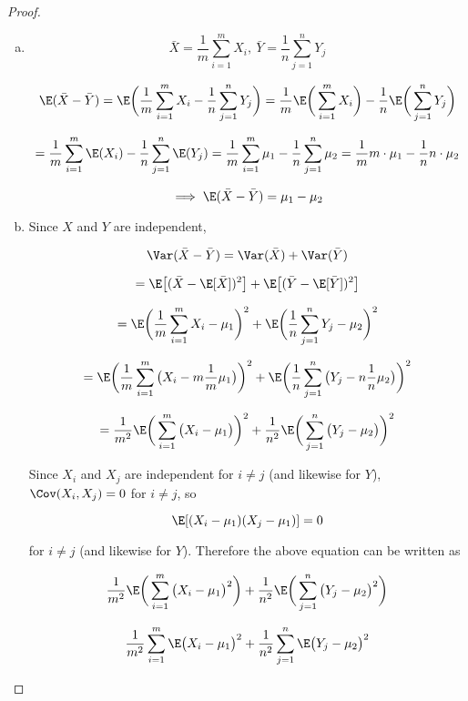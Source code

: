 \begin{proof}

\begin{enumerate}[a.]

\item

\[
\bar{X} = \frac{1}{m} \sum_{i=1}^m X_i, \ \bar{Y} = \frac{1}{n} \sum_{j=1}^n Y_j 
\]


\[
\E(\bar{X} - \bar{Y}) = \E\bigg(\frac{1}{m} \sum_{i=1}^m X_i - \frac{1}{n} \sum_{j=1}^n Y_j \bigg) = \frac{1}{m} \E\bigg( \sum_{i=1}^m X_i\bigg) - \frac{1}{n} \E \bigg(\sum_{j=1}^n Y_j \bigg)
\]

\[
= \frac{1}{m}  \sum_{i=1}^m \E (X_i)  - \frac{1}{n} \sum_{j=1}^n \E(Y_j) = \frac{1}{m}  \sum_{i=1}^m \mu_1  - \frac{1}{n} \sum_{j=1}^n \mu_2 = \frac{1}{m} m \cdot \mu_1 - \frac{1}{n} n \cdot \mu_2
\]

\[
\implies
\E(\bar{X} - \bar{Y}) = \mu_1 - \mu_2
\]

\item 

Since \(X\) and \(Y\) are independent,

\[
\Var (\bar{X} - \bar{Y}) = \Var(\bar{X}) + \Var(\bar{Y})
\]

\[
= \E\big[ (\bar{X} - \E[\bar{X}])^2 \big] + \E\big[ (\bar{Y} - \E[\bar{Y}])^2 \big]
\]

\[
= \E\bigg( \frac{1}{m} \sum_{i=1}^m X_i - \mu_1 \bigg)^2 + \E\bigg( \frac{1}{n} \sum_{j=1}^n Y_j - \mu_2 \bigg)^2
\]

\[
= \E\bigg( \frac{1}{m} \sum_{i=1}^m \big(X_i - m \frac{1}{m} \mu_1\big) \bigg)^2 + \E\bigg( \frac{1}{n} \sum_{j=1}^n \big( Y_j - n \frac{1}{n} \mu_2 \big) \bigg)^2
\]

\[
= \frac{1}{m^2 }\E\bigg(\sum_{i=1}^m \big(X_i - \mu_1\big) \bigg)^2 + \frac{1}{n^2} \E\bigg(  \sum_{j=1}^n \big( Y_j - \mu_2 \big) \bigg)^2
\]

Since \(X_i\) and \(X_j\) are independent for \(i \neq j\) (and likewise for \(Y\)), \(\Cov(X_i, X_j) = 0\) for \(i \neq j\), so 

\[
\E[(X_i - \mu_1)(X_j - \mu_1)] = 0
\] 

for \(i \neq j\) (and likewise for \(Y\)). Therefore the above equation can be written as

\[
\frac{1}{m^2 }\E\bigg(\sum_{i=1}^m \big(X_i - \mu_1\big)^2 \bigg) + \frac{1}{n^2} \E\bigg(  \sum_{j=1}^n \big( Y_j - \mu_2 \big)^2 \bigg)
\]

\[
\frac{1}{m^2 }\sum_{i=1}^m \E \big(X_i - \mu_1\big)^2  + \frac{1}{n^2}   \sum_{j=1}^n \E \big( Y_j - \mu_2 \big)^2
\]


\end{enumerate}
\end{proof}
